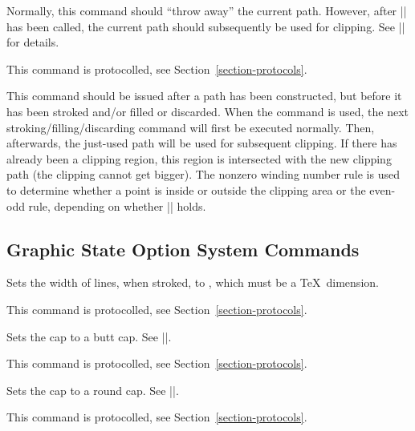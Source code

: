 \begin{command}{\pgfsys@discardpath}
    Normally, this command should ``throw away'' the current path. However,
    after |\pgfsys@clipnext| has been called, the current path should
    subsequently be used for clipping. See |\pgfsys@clipnext| for details.

    This command is protocolled, see Section~\ref{section-protocols}.
\end{command}

\begin{command}{\pgfsys@clipnext}
    This command should be issued after a path has been constructed, but before
    it has been stroked and/or filled or discarded. When the command is used,
    the next stroking/filling/discarding command will first be executed
    normally. Then, afterwards, the just-used path will be used for subsequent
    clipping. If there has already been a clipping region, this region is
    intersected with the new clipping path (the clipping cannot get bigger).
    The nonzero winding number rule is used to determine whether a point is
    inside or outside the clipping area or the even-odd rule, depending on
    whether |\ifpgfsys@eorule| holds.
\end{command}


\subsection{Graphic State Option System Commands}

\begin{command}{\pgfsys@setlinewidth{}}
    Sets the width of lines, when stroked, to , which must be a
    \TeX\ dimension.

    This command is protocolled, see Section~\ref{section-protocols}.
\end{command}

\begin{command}{\pgfsys@buttcap}
    Sets the cap to a butt cap. See |\pgfsys@stroke|.

    This command is protocolled, see Section~\ref{section-protocols}.
\end{command}

\begin{command}{\pgfsys@roundcap}
    Sets the cap to a round cap. See |\pgfsys@stroke|.

    This command is protocolled, see Section~\ref{section-protocols}.
\end{command}

